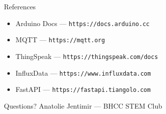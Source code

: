 \documentclass[aspectratio=169]{beamer}
\begin{document}
\begin{frame}{References}
\begin{itemize}
  \item Arduino Docs — \texttt{https://docs.arduino.cc}
  \item MQTT — \texttt{https://mqtt.org}
  \item ThingSpeak — \texttt{https://thingspeak.com/docs}
  \item InfluxData — \texttt{https://www.influxdata.com}
  \item FastAPI — \texttt{https://fastapi.tiangolo.com}
\end{itemize}
\end{frame}

\begin{frame}[standout]
Questions? \newline
\small Anatolie Jentimir — BHCC STEM Club
\end{frame}
\end{document}
